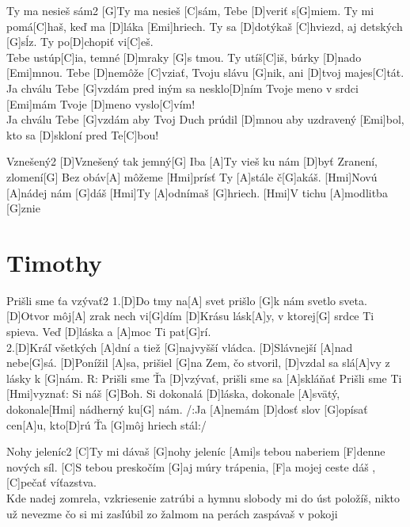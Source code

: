 \documentclass[12pt]{article}
\begin{document}
\begin{song}{Ty ma nesieš sám}{2}
	[G]Ty ma nesieš [C]sám, Tebe [D]veriť s[G]miem.
	Ty mi pomá[C]haš, keď ma [D]láka [Emi]hriech.
	Ty sa [D]dotýkaš [C]hviezd, aj detských [G]sĺz.
	Ty po[D]chopiť vi[C]eš.
	\\
	[G]Tebe ustúp[C]ia, temné [D]mraky [G]s tmou.
	Ty utíš[C]iš, búrky [D]nado [Emi]mnou.
	Tebe [D]nemôže [C]vziať, Tvoju slávu [G]nik,
	ani [D]tvoj majes[C]tát.
	\columnbreak
	[C]Ja chválu Tebe [G]vzdám
	pred iným sa nesklo[D]ním
	Tvoje meno v srdci [Emi]mám
	Tvoje [D]meno vyslo[C]vím!
	\\
	[C]Ja chválu Tebe [G]vzdám
	aby Tvoj Duch prúdil [D]mnou
	aby uzdravený [Emi]bol,
	kto sa [D]skloní pred Te[C]bou!
\end{song}

\begin{song}{Vznešený}{2}
	[D]Vznešený tak jemný[G]
	Iba [A]Ty vieš ku nám [D]byť
	Zranení, zlomení[G]
	Bez obáv[A] môžeme [Hmi]prísť
	Ty [A]stále č[G]akáš. [Hmi]Novú [A]nádej nám [G]dáš
	[Hmi]Ty [A]odnímaš [G]hriech. [Hmi]V tichu [A]modlitba [G]znie
	\columnbreak
\end{song}

\newpage

\section{Timothy}

\begin{song}{Prišli sme ťa vzývať}{2}
	1.[D]Do tmy na[A] svet 
	prišlo [G]k nám svetlo sveta.
	[D]Otvor môj[A] zrak nech vi[G]dím
	[D]Krásu lásk[A]y, v ktorej[G] srdce Ti spieva.
	Veď [D]láska a [A]moc Ti pat[G]rí.
	\\
	2.[D]Kráľ všetkých [A]dní 
	a tiež [G]najvyšší vládca.
	[D]Slávnejší [A]nad nebe[G]sá.
	[D]Ponížil [A]sa, prišiel [G]na Zem, čo stvoril,
	[D]vzdal sa slá[A]vy z lásky k [G]nám.
	\columnbreak
	R: Prišli sme Ťa [D]vzývať, 
	prišli sme sa [A]skláňať
	Prišli sme Ti [Hmi]vyznať: Si náš [G]Boh.
	Si dokonalá [D]láska, dokonale [A]svätý,
	dokonale[Hmi] nádherný ku[G] nám.
	/:Ja [A]nemám [D]dosť slov [G]opísať 
	cen[A]u, kto[D]rú Ťa [G]môj hriech stál:/
\end{song}

\begin{song}{Nohy jeleníc}{2}
	[C]Ty mi dávaš [G]nohy jeleníc
	[Ami]s tebou naberiem [F]denne nových síl.
	[C]S tebou preskočím [G]aj múry trápenia,
	[F]a mojej ceste dáš , [C]pečať víťazstva.
	\\
	Kde nadej zomrela, vzkriesenie zatrúbi
	a hymnu slobody mi do úst položíš,
	nikto už nevezme čo si mi zasľúbil
	zo žalmom na perách zaspávaš v pokoji
\end{song}
\end{document}
